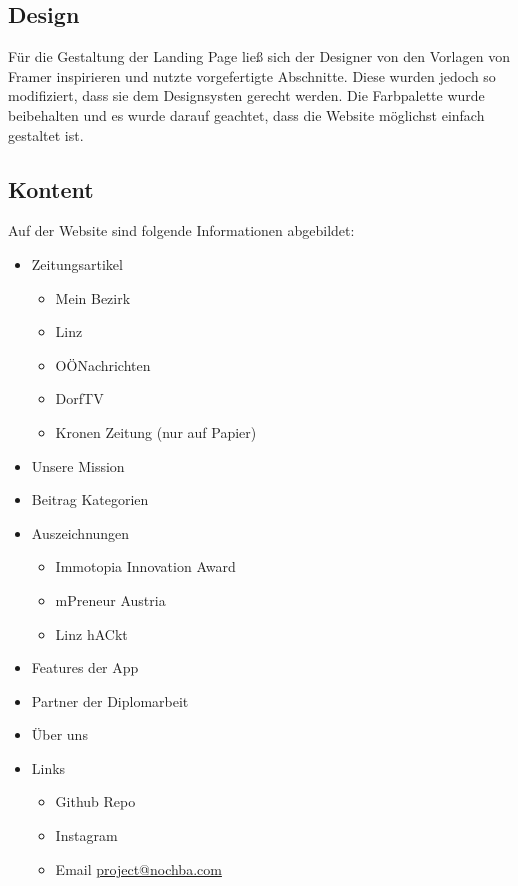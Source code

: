 \subsection{Design}
Für die Gestaltung der Landing Page ließ sich der Designer
von den Vorlagen von Framer inspirieren und nutzte
vorgefertigte Abschnitte. Diese wurden jedoch so
modifiziert, dass sie dem Designsysten gerecht werden. Die
Farbpalette wurde beibehalten und es wurde darauf geachtet,
dass die Website möglichst einfach gestaltet ist.

\subsection{Kontent}
Auf der Website sind folgende Informationen abgebildet:
\begin{itemize}
  \item Zeitungsartikel
        \begin{itemize}
          \item Mein Bezirk\cite{mein_bezirk}
          \item Linz\cite{linz}
          \item OÖNachrichten\cite{oo_nachrichten}
          \item DorfTV\cite{dorf_tv}
          \item Kronen Zeitung (nur auf Papier)
        \end{itemize}
  \item Unsere Mission
  \item Beitrag Kategorien
  \item Auszeichnungen
        \begin{itemize}
          \item Immotopia Innovation Award
          \item mPreneur Austria
          \item Linz hACkt
        \end{itemize}
  \item Features der App
  \item Partner der Diplomarbeit
  \item Über uns
  \item Links
        \begin{itemize}
          \item Github Repo\cite{github_repo}
          \item Instagram\cite{nochba_instagram}
          \item Email \href{mailto:project@nochba.com}{project@nochba.com}
        \end{itemize}
\end{itemize}



